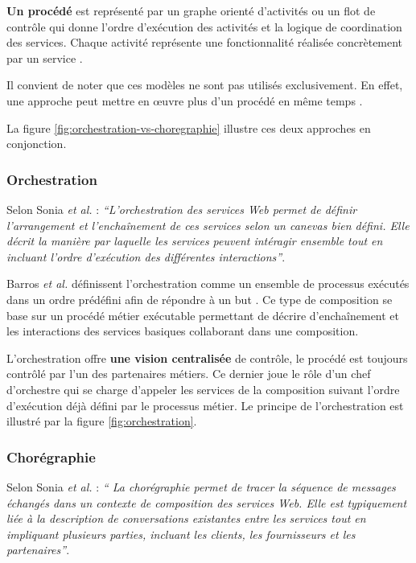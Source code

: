   \textbf{Un procédé} est représenté par un graphe orienté d'activités
  ou un flot de contrôle qui donne l'ordre d'exécution des activités
  et la logique de coordination des services. Chaque activité
  représente une fonctionnalité réalisée concrètement par un service
  \cite{chollet2009orchestration}.\medskip

  Il convient de noter que ces modèles ne sont pas utilisés
  exclusivement. En effet, une approche peut mettre en œuvre plus d'un
  procédé en même temps \cite{baryannis2010}.\medskip

  La figure \ref{fig:orchestration-vs-choregraphie} illustre ces deux
  approches en conjonction.

  

    \subsubsection{Orchestration}
    \label{sec:orchestration}
    Selon Sonia \emph{et al.} \cite{jamal2005environnement}:
    \emph{``L'orchestration des services Web permet de définir
      l'arrangement et l'enchaînement de ces services selon un
      canevas bien défini. Elle décrit la manière par laquelle les
      services peuvent intéragir ensemble tout en incluant l'ordre
      d'exécution des différentes interactions''}.\bigskip

    Barros \emph{et al.} \cite{barros2006standards} définissent
    l'orchestration comme un ensemble de processus exécutés dans un
    ordre prédéfini afin de répondre à un but
    \cite{lopez2008selection}. Ce type de composition se base sur un
    procédé métier exécutable permettant de décrire d'enchaînement et
    les interactions des services basiques collaborant dans une
    composition.\medskip

    L'orchestration offre \textbf{une vision centralisée} de contrôle,
    le procédé est toujours contrôlé par l'un des partenaires
    métiers. Ce dernier joue le rôle d'un chef d'orchestre qui se
    charge d'appeler les services de la composition suivant l'ordre
    d'exécution déjà défini par le processus métier. Le principe de
    l'orchestration est illustré par la figure
    \ref{fig:orchestration}.

    \subsubsection{Chorégraphie}
    \label{sec:choregraphie-sec}
    Selon Sonia \emph{et al.} \cite{jamal2005environnement} : \emph{``
      La chorégraphie permet de tracer la séquence de messages
      échangés dans un contexte de composition des services Web. Elle
      est typiquement liée à la description de conversations
      existantes entre les services tout en impliquant plusieurs
      parties, incluant les clients, les fournisseurs et les
      partenaires''}.\medskip

